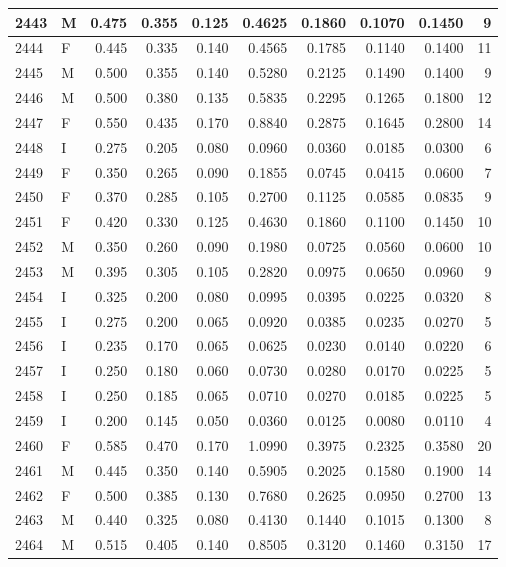 \documentclass[9pt,twocolumn,twoside,]{pnas-new}
\begin{document}
\begin{tabular}{l|l|r|r|r|r|r|r|r|r}
\hline
2443 & M & 0.475 & 0.355 & 0.125 & 0.4625 & 0.1860 & 0.1070 & 0.1450 & 9\\
\hline
2444 & F & 0.445 & 0.335 & 0.140 & 0.4565 & 0.1785 & 0.1140 & 0.1400 & 11\\
\hline
2445 & M & 0.500 & 0.355 & 0.140 & 0.5280 & 0.2125 & 0.1490 & 0.1400 & 9\\
\hline
2446 & M & 0.500 & 0.380 & 0.135 & 0.5835 & 0.2295 & 0.1265 & 0.1800 & 12\\
\hline
2447 & F & 0.550 & 0.435 & 0.170 & 0.8840 & 0.2875 & 0.1645 & 0.2800 & 14\\
\hline
2448 & I & 0.275 & 0.205 & 0.080 & 0.0960 & 0.0360 & 0.0185 & 0.0300 & 6\\
\hline
2449 & F & 0.350 & 0.265 & 0.090 & 0.1855 & 0.0745 & 0.0415 & 0.0600 & 7\\
\hline
2450 & F & 0.370 & 0.285 & 0.105 & 0.2700 & 0.1125 & 0.0585 & 0.0835 & 9\\
\hline
2451 & F & 0.420 & 0.330 & 0.125 & 0.4630 & 0.1860 & 0.1100 & 0.1450 & 10\\
\hline
2452 & M & 0.350 & 0.260 & 0.090 & 0.1980 & 0.0725 & 0.0560 & 0.0600 & 10\\
\hline
2453 & M & 0.395 & 0.305 & 0.105 & 0.2820 & 0.0975 & 0.0650 & 0.0960 & 9\\
\hline
2454 & I & 0.325 & 0.200 & 0.080 & 0.0995 & 0.0395 & 0.0225 & 0.0320 & 8\\
\hline
2455 & I & 0.275 & 0.200 & 0.065 & 0.0920 & 0.0385 & 0.0235 & 0.0270 & 5\\
\hline
2456 & I & 0.235 & 0.170 & 0.065 & 0.0625 & 0.0230 & 0.0140 & 0.0220 & 6\\
\hline
2457 & I & 0.250 & 0.180 & 0.060 & 0.0730 & 0.0280 & 0.0170 & 0.0225 & 5\\
\hline
2458 & I & 0.250 & 0.185 & 0.065 & 0.0710 & 0.0270 & 0.0185 & 0.0225 & 5\\
\hline
2459 & I & 0.200 & 0.145 & 0.050 & 0.0360 & 0.0125 & 0.0080 & 0.0110 & 4\\
\hline
2460 & F & 0.585 & 0.470 & 0.170 & 1.0990 & 0.3975 & 0.2325 & 0.3580 & 20\\
\hline
2461 & M & 0.445 & 0.350 & 0.140 & 0.5905 & 0.2025 & 0.1580 & 0.1900 & 14\\
\hline
2462 & F & 0.500 & 0.385 & 0.130 & 0.7680 & 0.2625 & 0.0950 & 0.2700 & 13\\
\hline
2463 & M & 0.440 & 0.325 & 0.080 & 0.4130 & 0.1440 & 0.1015 & 0.1300 & 8\\
\hline
2464 & M & 0.515 & 0.405 & 0.140 & 0.8505 & 0.3120 & 0.1460 & 0.3150 & 17\\

\end{tabular}
\end{document}
